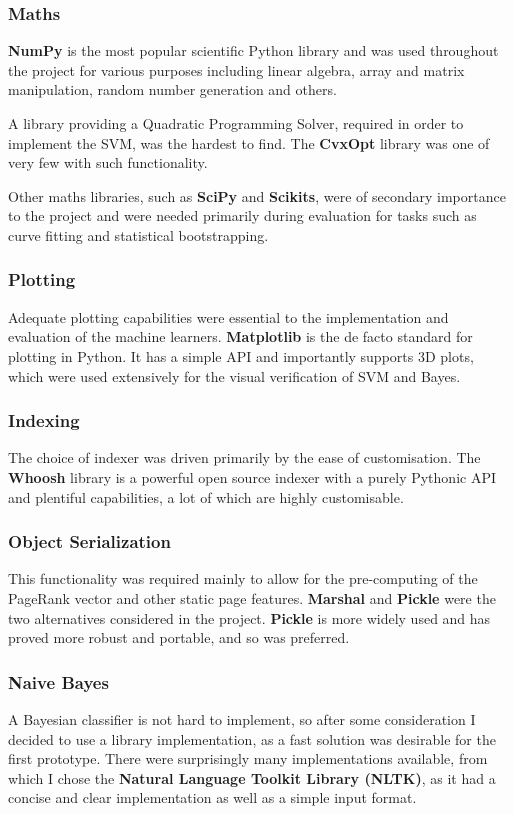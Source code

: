 \documentclass[12pt,a4paper,notitlepage,twoside]{scrbook}
\begin{document}
\subsubsection*{Maths}
\textbf{NumPy} is the most popular scientific Python library and was used throughout the
project for various purposes including linear algebra, array and matrix manipulation,
random number generation and others.

A library providing a Quadratic Programming Solver, required in order to implement the
SVM, was the hardest to find. The \textbf{CvxOpt} library was one of very few with such
functionality.

Other maths libraries, such as \textbf{SciPy} and \textbf{Scikits}, were of secondary importance to
the project and were needed primarily during evaluation for tasks such as curve fitting and
statistical bootstrapping.
\subsubsection*{Plotting}
Adequate plotting capabilities were essential to the implementation and evaluation of the
machine learners. \textbf{Matplotlib} is the de facto standard for plotting in Python. It
has a simple API and importantly supports 3D plots, which were used extensively for the visual
verification of SVM and Bayes.
\subsubsection*{Indexing}
The choice of indexer was driven primarily by the ease of customisation. The
\textbf{Whoosh} library is a powerful open source indexer with a purely Pythonic API and
plentiful capabilities, a lot of which are highly
customisable.

\subsubsection*{Object Serialization}
This functionality was required mainly to allow for the pre-computing of the PageRank vector
and other static page features. \textbf{Marshal} and \textbf{Pickle} were the two
alternatives considered in the project. \textbf{Pickle} is more widely used and has proved more robust and
portable, and so was preferred.
\subsubsection*{Naive Bayes}
A Bayesian classifier is not hard to implement, so after some consideration I decided to use a library
implementation, as a fast solution was desirable for the first prototype. There were
surprisingly many implementations available, from which I chose the \textbf{Natural
Language Toolkit Library (NLTK)}, as it had a concise and clear implementation as well as a
simple input format.
\end{document}
